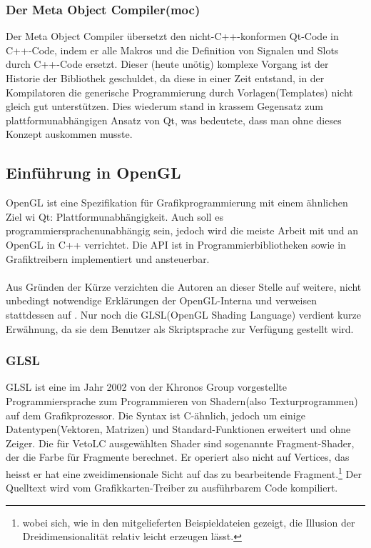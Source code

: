 \subsubsection{Der Meta Object Compiler(moc)}
	Der Meta Object Compiler übersetzt den nicht-C++-konformen Qt-Code in C++-Code, indem er alle Makros und die Definition von Signalen und Slots
	durch C++-Code ersetzt. Dieser (heute unötig) komplexe Vorgang ist der Historie der Bibliothek geschuldet, da diese in einer Zeit entstand, in der
	Kompilatoren die generische Programmierung durch Vorlagen(Templates) nicht gleich gut unterstützen. Dies wiederum stand in krassem Gegensatz
	zum plattform\-un\-abhängigen Ansatz von Qt, was bedeutete, dass man ohne dieses Konzept auskommen musste.

\subsection{Einführung in OpenGL}
    OpenGL ist eine Spezifikation für Grafikprogrammierung mit einem ähnlichen Ziel wi Qt: Plattformunabhängigkeit. Auch soll es programmiersprachenunab\-häng\-ig 
    sein, jedoch wird die meiste Arbeit mit und an OpenGL in C++ verrichtet. Die API ist in Programmierbibliotheken sowie in Grafiktreibern implementiert und 
    ansteuerbar.
\paragraph{}
    Aus Gründen der Kürze verzichten die Autoren an dieser Stelle auf weitere, nicht unbedingt notwendige Erklärungen der OpenGL-Interna und verweisen stattdessen
    auf \cite{WHS10}. Nur noch die GLSL(OpenGL Shading Language) verdient kurze Erwähnung, da sie dem Benutzer als Skriptsprache zur Verfügung gestellt wird.
\subsubsection{GLSL}
    GLSL ist eine im Jahr 2002 von der Khronos Group vorgestellte Programmiersprache zum Programmieren von Shadern(also Texturprogrammen) auf dem Grafikprozessor.
    Die Syntax ist C-ähnlich, jedoch um einige Datentypen(Vektor\-en, Matrizen) und Standard-Funktionen erweitert und ohne Zeiger. Die für VetoLC ausgewählten Shader
    sind sogenannte Fragment-Shader, der die Farbe für Fragmente berechnet. Er operiert also nicht auf Vertices, das heisst er hat eine  zweidimensionale Sicht auf
    das zu bearbeitende Fragment.\footnote{wobei sich, wie in den mitgelieferten Beispieldateien gezeigt, die Illusion der Dreidimensionalität relativ leicht erzeugen 
    lässt.} Der Quelltext wird vom Grafikkarten-Treiber zu ausführbarem Code kompiliert.



